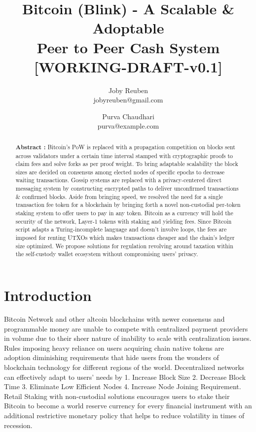 \documentclass[a4paper,10pt]{article}
\title{
 \Large \textbf{Bitcoin (Blink) - A Scalable \& Adoptable \\
Peer to Peer Cash System}\\
\vspace{6mm}
\scriptsize [WORKING-DRAFT-v0.1]
}
\author{ \myfontt Joby Reuben \\ \myfontt jobyreuben@gmail.com \and  \myfontt Purva Chaudhari \\ \myfontt purva@example.com}
\date{}
\begin{document}
\maketitle
\begin{abstract}
\noindent \textbf{Abstract :} Bitcoin's PoW is replaced with a propagation competition on blocks sent across validators under a certain time interval stamped with cryptographic proofs to claim fees and solve forks as per proof weight. To bring adaptable scalability the block sizes are decided on consensus among elected nodes of specific epochs to decrease waiting transactions. Gossip systems are replaced with a privacy-centered direct messaging system by constructing encrypted paths to deliver unconfirmed transactions \& confirmed blocks. Aside from bringing speed, we resolved the need for a single transaction fee token for a blockchain by bringing forth a novel non-custodial per-token staking system to offer users to pay in any token. Bitcoin as a currency will hold the security of the network, Layer-1 tokens with staking and yielding fees. Since Bitcoin script adapts a Turing-incomplete language and doesn't involve loops, the fees are imposed for renting UTXOs which makes transactions cheaper and the chain's ledger size optimized. We propose solutions for regulation revolving around taxation within the self-custody wallet ecosystem without compromising users' privacy. 

\end{abstract}

\section{Introduction}
Bitcoin Network and other altcoin blockchains with newer consensus and programmable money are unable to compete with centralized payment providers in volume due to their sheer nature of inability to scale with centralization issues. Rules imposing heavy reliance on users acquiring chain native tokens are adoption diminishing requirements that hide users from the wonders of blockchain technology for different regions of the world. Decentralized networks can effectively adapt to users' needs by 1. Increase Block Size 2. Decrease Block Time 3. Eliminate Low Efficient Nodes 4. Increase Node Joining Requirement. Retail Staking with non-custodial solutions encourages users to stake their Bitcoin to become a world reserve currency for every financial instrument with an additional restrictive monetary policy that helps to reduce volatility in times of recession. 
\end{document}
